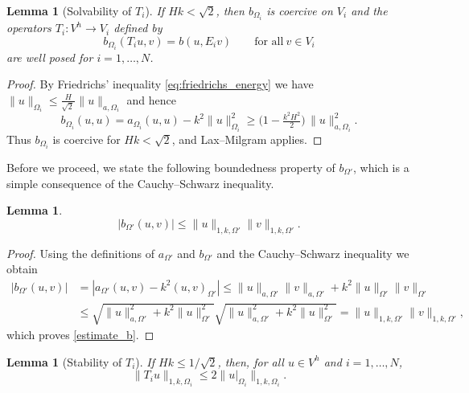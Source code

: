 \documentclass[preprint,3p,times]{elsarticle}
\newtheorem{lemma}[theorem]{Lemma}
\theoremstyle{definition}
\numberwithin{equation}{section}
\begin{document}
\begin{lemma}[Solvability of $T_i$]\label{lemma_3_4}
If $Hk<\sqrt{2}$, then $b_{\Omega_i}$ is coercive on $V_i$ and the operators $T_i:V^h\to V_i$ defined by
\[
	b_{\Omega_i}(T_i u, v) = b(u,E_i v) \qquad \text{for all} \ v\in V_i
\]
are well posed for $i=1,\dots,N$.
\end{lemma}

\begin{proof}
By Friedrichs' inequality \eqref{eq:friedrichs_energy} we have
$\|u\|_{\Omega_i} \le \frac{H}{\sqrt{2}\,} \|u\|_{{a,\Omega_i}}$ and hence
\[
	b_{\Omega_i}(u,u) = a_{\Omega_i}(u,u) - k^2\|u\|_{\Omega_i}^2
	\ge \Big(1 - \tfrac{k^2 H^2}{2}\Big)\,\|u\|_{{a,\Omega_i}}^2.
\]
Thus $b_{\Omega_i}$ is coercive for $Hk<\sqrt{2}$, and Lax--Milgram applies.
\end{proof}

Before we proceed, we state the following boundedness property of  $b_{\Omega'}$, 
which is a simple consequence of the Cauchy--Schwarz inequality.

\begin{lemma}\label{prop:est_b}
\begin{equation}\label{estimate_b}
	|b_{\Omega'}(u,v)| \le \|u\|_{1,k,\Omega'}\|v\|_{1,k,\Omega'}. 
\end{equation}
\end{lemma} 

\begin{proof}
Using the definitions of $a_{\Omega'}$ and $b_{\Omega'}$ and the Cauchy--Schwarz inequality we obtain
\begin{align*}
	|b_{\Omega'}(u,v)| &= |a_{\Omega'}(u,v) - k^2 (u,v)_{\Omega'}| 
	\le \|u\|_{{a,\Omega'}} \|v\|_{{a,\Omega'}} + k^2 \|u\|_{\Omega'}\|v\|_{\Omega'} 
	\\[1ex] 
	&\le \sqrt{\|u\|_{{a,\Omega'}}^2 + k^2 \|u\|_{\Omega'}^2} \sqrt{\|u\|_{{a,\Omega'}}^2 + k^2 \|u\|_{\Omega'}^2} 
	= \|u\|_{1, k, \Omega'} \|v\|_{1, k, \Omega'},
\end{align*}
which proves \eqref{estimate_b}.
\end{proof}


\begin{lemma}[Stability of $T_i$]\label{lemma_3_6}
If $Hk\le 1/\sqrt{2}$, then, for all $u\in V^h$ and $i=1,\dots,N$,
\begin{equation}\label{stab_T_i}
	\|T_i u\|_{1,k,\Omega_i} \le  2\|u|_{\Omega_i}\|_{1,k,\Omega_i}.
\end{equation}
\end{lemma}
\end{document}
